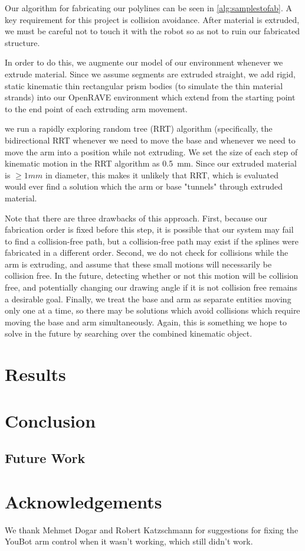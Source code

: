\documentclass[conference]{acmsiggraph}
\begin{document}
Our algorithm for fabricating our polylines can be seen in \ref{alg:samplestofab}.  A key requirement for this project is collision avoidance.  After material is extruded, we must be careful not to touch it with the robot so as not to ruin our fabricated structure.

In order to do this, we augmente our model of our environment whenever we extrude material.  Since we assume segments are extruded straight, we add rigid, static kinematic thin rectangular prism bodies (to simulate the thin material strands) into our OpenRAVE environment which extend from the starting point to the end point of each extruding arm movement.

we run a rapidly exploring random tree (RRT) \cite{RRT} algorithm (specifically, the bidirectional RRT \cite{biRRT} whenever we need to move the base and whenever we need to move the arm into a position while not extruding.  We set the size of each step of kinematic motion in the RRT algorithm as 0.5~mm.  Since our extruded material is $\geq 1mm$ in diameter, this makes it unlikely that RRT, which is evaluated would ever find a solution which the arm or base "tunnels" through extruded material.

Note that there are three drawbacks of this approach. First, because our fabrication order is fixed before this step, it is possible that our system may fail to find a collision-free path, but a collision-free path may exist if the splines were fabricated in a different order.  Second, we do not check for collisions while the arm is extruding, and assume that these small motions will necessarily be collision free.  In the future, detecting whether or not this motion will be collision free, and potentially changing our drawing angle if it is not collision free remains a desirable goal.  Finally, we treat the base and arm as separate entities moving only one at a time, so there may be solutions which avoid collisions which require moving the base and arm simultaneously.  Again, this is something we hope to solve in the future by searching over the combined kinematic object.

\section{Results}

\section{Conclusion}

\subsection{Future Work}



\section*{Acknowledgements}

We thank Mehmet Dogar and Robert Katzschmann for suggestions for fixing the YouBot arm control when it wasn't working, which still didn't work.





\end{document}
